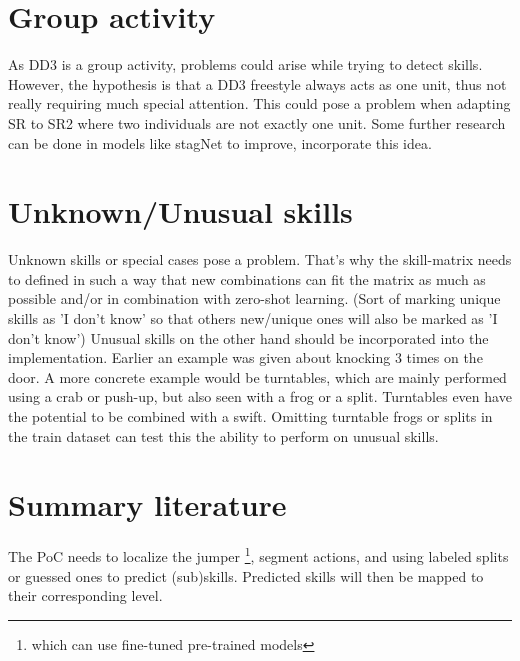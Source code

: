 \section{Group activity}

As DD3 is a group activity, problems could arise while trying to detect skills. However, the hypothesis is that a DD3 freestyle always acts as one unit, thus not really requiring much special attention. This could pose a problem when adapting SR to SR2 where two individuals are not exactly one unit. Some further research can be done in models like stagNet \autocite{Qi_2020} to improve, incorporate this idea.

\section{Unknown/Unusual skills}
\label{subsec:bp-literature-unknown-unusual-skills}

Unknown skills or special cases pose a problem. That’s why the skill-matrix needs to defined
in such a way that new combinations can fit the matrix as much as possible and/or in combination with zero-shot learning. (Sort of marking unique skills as ’I don’t know’ so that others new/unique ones will also be marked as ’I don’t know’) Unusual skills on the other hand should be incorporated into the implementation.
Earlier an example was given about knocking 3 times on the door. A more concrete example would be turntables, which are mainly performed using a crab or push-up, but also seen with a frog or a split.
Turntables even have the potential to be combined with a swift. Omitting turntable frogs or splits in the train dataset can test this the ability to perform on unusual skills.

\section{Summary literature}
\label{subsec:bp-summary literature}

The PoC needs to localize the jumper \footnote{which can use fine-tuned pre-trained models}, segment actions, and using labeled splits or guessed ones to predict (sub)skills.
Predicted skills will then be mapped to their corresponding level.
